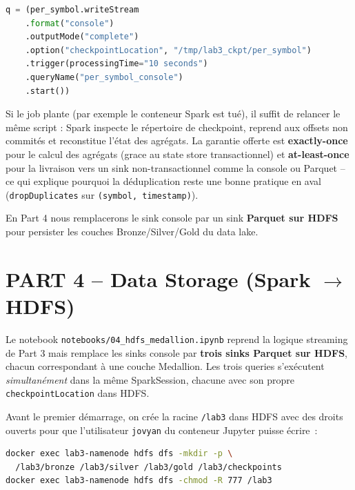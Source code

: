 \documentclass{RapportINPTCLOUD}
\begin{document}
\begin{lstlisting}[style=code, language=Python, caption=Query streaming avec checkpoint]
q = (per_symbol.writeStream
    .format("console")
    .outputMode("complete")
    .option("checkpointLocation", "/tmp/lab3_ckpt/per_symbol")
    .trigger(processingTime="10 seconds")
    .queryName("per_symbol_console")
    .start())
\end{lstlisting}

Si le job plante (par exemple le conteneur Spark est tu\'{e}), il suffit de relancer le m\^{e}me script : Spark inspecte le r\'{e}pertoire de checkpoint, reprend aux offsets non commit\'{e}s et reconstitue l'\'{e}tat des agr\'{e}gats. La garantie offerte est \textbf{exactly-once} pour le calcul des agr\'{e}gats (grace au state store transactionnel) et \textbf{at-least-once} pour la livraison vers un sink non-transactionnel comme la console ou Parquet -- ce qui explique pourquoi la d\'{e}duplication reste une bonne pratique en aval (\texttt{dropDuplicates} sur \texttt{(symbol, timestamp)}).

En Part 4 nous remplacerons le sink console par un sink \textbf{Parquet sur HDFS} pour persister les couches Bronze/Silver/Gold du data lake.

\section{PART 4 -- Data Storage (Spark $\rightarrow$ HDFS)}

Le notebook \texttt{notebooks/04\_hdfs\_medallion.ipynb} reprend la logique streaming de Part 3 mais remplace les sinks console par \textbf{trois sinks Parquet sur HDFS}, chacun correspondant \`{a} une couche Medallion. Les trois queries s'ex\'{e}cutent \textit{simultan\'{e}ment} dans la m\^{e}me SparkSession, chacune avec son propre \texttt{checkpointLocation} dans HDFS.

Avant le premier d\'{e}marrage, on cr\'{e}e la racine \texttt{/lab3} dans HDFS avec des droits ouverts pour que l'utilisateur \texttt{jovyan} du conteneur Jupyter puisse \'{e}crire~:

\begin{lstlisting}[style=code, language=bash]
docker exec lab3-namenode hdfs dfs -mkdir -p \
  /lab3/bronze /lab3/silver /lab3/gold /lab3/checkpoints
docker exec lab3-namenode hdfs dfs -chmod -R 777 /lab3
\end{lstlisting}
\end{document}
